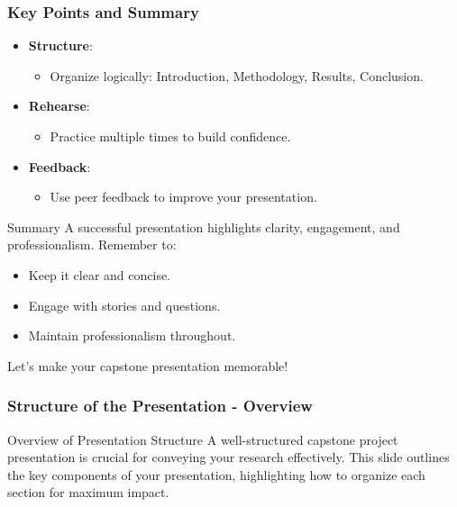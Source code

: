 \documentclass[aspectratio=169]{beamer}
\begin{document}
\begin{frame}[fragile]
    \frametitle{Key Points and Summary}
    \begin{itemize}
        \item \textbf{Structure}:
        \begin{itemize}
            \item Organize logically: Introduction, Methodology, Results, Conclusion.
        \end{itemize}
        \item \textbf{Rehearse}:
        \begin{itemize}
            \item Practice multiple times to build confidence.
        \end{itemize}
        \item \textbf{Feedback}:
        \begin{itemize}
            \item Use peer feedback to improve your presentation.
        \end{itemize}
    \end{itemize}
    
    \begin{block}{Summary}
        A successful presentation highlights clarity, engagement, and professionalism. Remember to:
        \begin{itemize}
            \item Keep it clear and concise.
            \item Engage with stories and questions.
            \item Maintain professionalism throughout.
        \end{itemize}
    \end{block}
    
    Let's make your capstone presentation memorable!
\end{frame}

\begin{frame}[fragile]
    \frametitle{Structure of the Presentation - Overview}
    \begin{block}{Overview of Presentation Structure}
        A well-structured capstone project presentation is crucial for conveying your research effectively. This slide outlines the key components of your presentation, highlighting how to organize each section for maximum impact.
    \end{block}
\end{frame}
\end{document}
